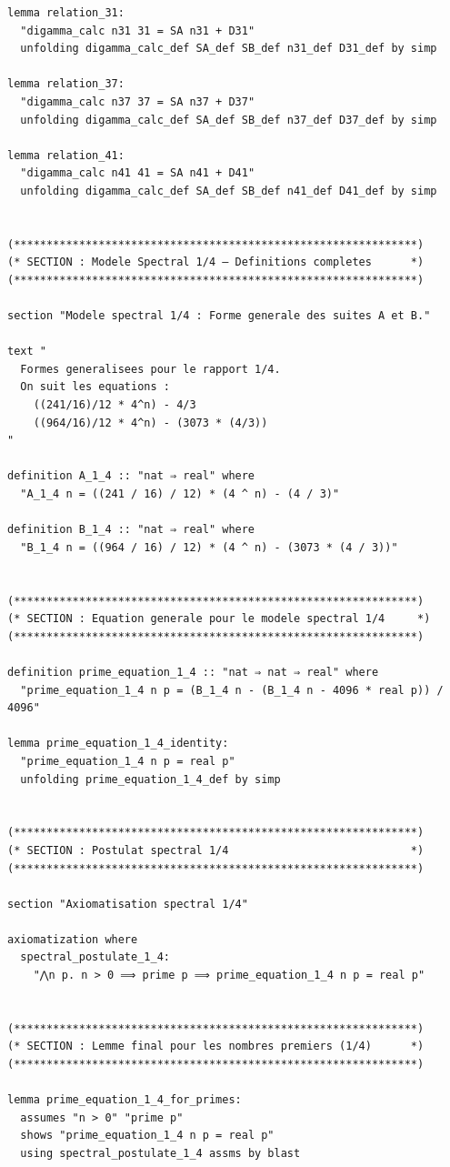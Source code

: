 \documentclass[a4paper,11pt]{article}
\begin{document}
\begin{holcode}[title={\textcolor{white}{Fichier : methode\_spectral.thy -- Partie 2/4}}]
\begin{lstlisting}
lemma relation_31:
  "digamma_calc n31 31 = SA n31 + D31"
  unfolding digamma_calc_def SA_def SB_def n31_def D31_def by simp

lemma relation_37:
  "digamma_calc n37 37 = SA n37 + D37"
  unfolding digamma_calc_def SA_def SB_def n37_def D37_def by simp

lemma relation_41:
  "digamma_calc n41 41 = SA n41 + D41"
  unfolding digamma_calc_def SA_def SB_def n41_def D41_def by simp


(**************************************************************)
(* SECTION : Modele Spectral 1/4 – Definitions completes      *)
(**************************************************************)

section "Modele spectral 1/4 : Forme generale des suites A et B."

text "
  Formes generalisees pour le rapport 1/4.
  On suit les equations :
    ((241/16)/12 * 4^n) - 4/3
    ((964/16)/12 * 4^n) - (3073 * (4/3))
"

definition A_1_4 :: "nat ⇒ real" where
  "A_1_4 n = ((241 / 16) / 12) * (4 ^ n) - (4 / 3)"

definition B_1_4 :: "nat ⇒ real" where
  "B_1_4 n = ((964 / 16) / 12) * (4 ^ n) - (3073 * (4 / 3))"


(**************************************************************)
(* SECTION : Equation generale pour le modele spectral 1/4     *)
(**************************************************************)

definition prime_equation_1_4 :: "nat ⇒ nat ⇒ real" where
  "prime_equation_1_4 n p = (B_1_4 n - (B_1_4 n - 4096 * real p)) / 4096"

lemma prime_equation_1_4_identity:
  "prime_equation_1_4 n p = real p"
  unfolding prime_equation_1_4_def by simp


(**************************************************************)
(* SECTION : Postulat spectral 1/4                            *)
(**************************************************************)

section "Axiomatisation spectral 1/4"

axiomatization where
  spectral_postulate_1_4:
    "⋀n p. n > 0 ⟹ prime p ⟹ prime_equation_1_4 n p = real p"


(**************************************************************)
(* SECTION : Lemme final pour les nombres premiers (1/4)      *)
(**************************************************************)

lemma prime_equation_1_4_for_primes:
  assumes "n > 0" "prime p"
  shows "prime_equation_1_4 n p = real p"
  using spectral_postulate_1_4 assms by blast



\end{lstlisting}
\end{holcode}
\end{document}
